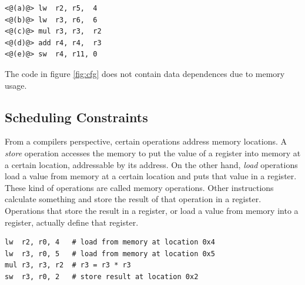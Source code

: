 \begin{lstlisting}
<@(a)@> lw  r2, r5,  4
<@(b)@> lw  r3, r6,  6
<@(c)@> mul r3, r3,  r2
<@(d)@> add r4, r4,  r3
<@(e)@> sw  r4, r11, 0
\end{lstlisting}

The code in figure \ref{fig:cfg} does not contain data dependences due to memory usage.

\subsection{Scheduling Constraints}\label{sec:scheduling_and_ra}
From a compilers perspective, certain operations address memory locations. A \emph{store} operation accesses the memory to put the value of a register into memory at a certain location, addressable by its address. On the other hand, \emph{load} operations load a value from memory at a certain location and puts that value in a register. These kind of operations are called memory operations. Other instructions calculate something and store the result of that operation in a register. Operations that store the result in a register, or load a value from memory into a register, actually define that register. %

\begin{lstlisting}
lw  r2, r0, 4   # load from memory at location 0x4
lw  r3, r0, 5   # load from memory at location 0x5
mul r3, r3, r2  # r3 = r3 * r3
sw  r3, r0, 2   # store result at location 0x2
\end{lstlisting}

